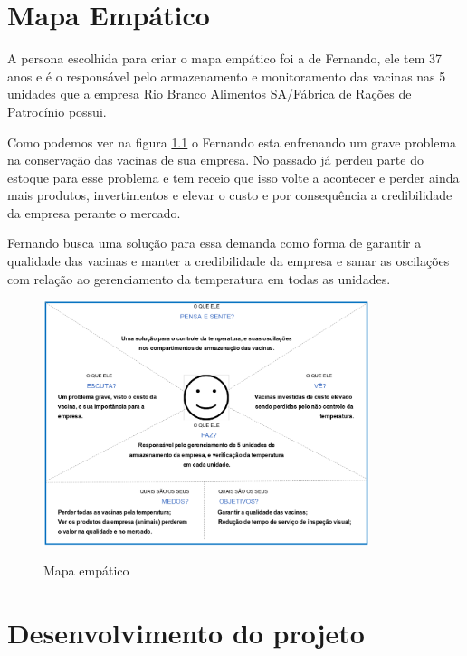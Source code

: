 \documentclass[hidelinks, 12pt, a4paper, brazil, oneside]{abntex2}
\begin{document}
\chapter{Mapa Empático}

    A persona escolhida para criar o mapa empático
    foi a de Fernando, ele tem 37 anos e é o responsável
    pelo armazenamento e monitoramento das vacinas
    nas 5 unidades que a empresa 
    Rio Branco Alimentos SA/Fábrica de Rações de Patrocínio possui.

    Como podemos ver na figura \ref{fig:mapaEmpatico}
    o Fernando esta enfrenando um grave problema na 
    conservação das vacinas de sua empresa.
    No passado já perdeu parte do estoque para esse problema 
    e tem receio que isso volte a acontecer e perder ainda 
    mais produtos, invertimentos e elevar o custo
    e por consequência a credibilidade da 
    empresa perante o mercado.

    Fernando busca uma solução para essa demanda 
    como forma de garantir a qualidade das vacinas e
    manter a credibilidade da empresa e sanar as
    oscilações com relação ao gerenciamento da temperatura
    em todas as unidades.

    \begin{figure}
        \caption{Mapa empático}
        \centering
        \includegraphics[width=0.85\textwidth]{img/mapa_empatico.png}
        \label{fig:mapaEmpatico}
    \end{figure}

\chapter{Desenvolvimento do projeto}
\end{document}
